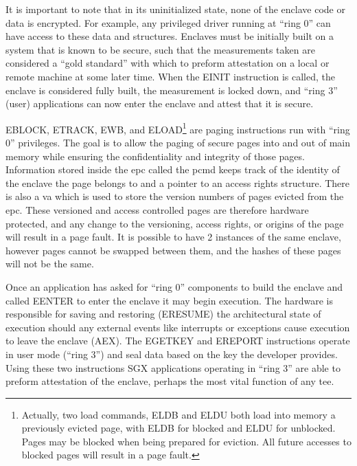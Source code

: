 It is important to note that in its uninitialized state, none of the enclave code or data is encrypted. For example, any privileged driver running at ``ring 0'' can have access to these data and structures. Enclaves must be initially built on a system that is known to be secure, such that the measurements taken are considered a ``gold standard'' with which to preform attestation on a local or remote machine at some later time. When the EINIT instruction is called, the enclave is considered fully built, the measurement is locked down, and ``ring 3'' (user) applications can now enter the enclave and attest that it is secure. 

EBLOCK, ETRACK, EWB, and ELOAD\footnote{Actually, two load commands, ELDB and ELDU both load into memory a previously evicted page, with ELDB for blocked and ELDU for unblocked. Pages may be blocked when being prepared for eviction. All future accesses to blocked pages will result in a page fault.} are paging instructions run with ``ring 0'' privileges. The goal is to allow the paging of secure pages into and out of main memory while ensuring the confidentiality and integrity of those pages. Information stored inside the \gls{epc} called the \gls{pcmd} keeps track of the identity of the enclave the page belongs to and a pointer to an access rights structure. There is also a \gls{va} which is used to store the version numbers of pages evicted from the \gls{epc}. These versioned and access controlled pages are therefore hardware protected, and any change to the versioning, access rights, or origins of the page will result in a page fault. It is possible to have 2 instances of the same enclave, however pages cannot be swapped between them, and the hashes of these pages will not be the same.

Once an application has asked for ``ring 0'' components to build the enclave and called EENTER to enter the enclave it may begin execution. The hardware is responsible for saving and restoring (ERESUME) the architectural state of execution should any external events like interrupts or exceptions cause execution to leave the enclave (AEX). The EGETKEY and EREPORT instructions operate in user mode (``ring 3'') and seal data based on the key the developer provides. Using these two instructions SGX applications operating in ``ring 3'' are able to preform attestation of the enclave, perhaps the most vital function of any \gls{tee}.

